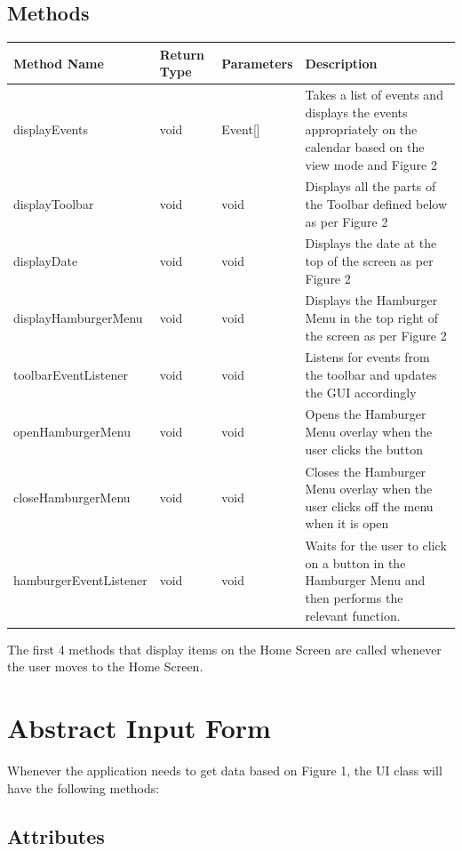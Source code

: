 \documentclass{scrreprt}
\begin{document}
\subsection{Methods}

\begin{center}
\begin{longtable}{ | p{5cm} | p{2cm} | p{3cm} | p{5cm} | }
\hline
\textbf{Method Name} & \textbf{Return Type} & \textbf{Parameters} & \textbf{Description} \\
\hline
displayEvents & void & Event[] & Takes a list of events and displays the events appropriately on the calendar based on the view mode and Figure 2 \\
\hline
displayToolbar & void & void & Displays all the parts of the Toolbar defined below as per Figure 2 \\
\hline
displayDate & void & void & Displays the date at the top of the screen as per Figure 2 \\
\hline
displayHamburgerMenu & void & void & Displays the Hamburger Menu in the top right of the screen as per Figure 2 \\
\hline
toolbarEventListener & void & void & Listens for events from the toolbar and updates the GUI accordingly \\
\hline
openHamburgerMenu & void & void & Opens the Hamburger Menu overlay when the user clicks the button \\
\hline
closeHamburgerMenu & void & void & Closes the Hamburger Menu overlay when the user clicks off the menu when it is open \\
\hline
hamburgerEventListener & void & void & Waits for the user to click on a button in the Hamburger Menu and then performs the relevant function. \\
\hline
\end{longtable}
\end{center}

The first 4 methods that display items on the Home Screen are called whenever the user moves to the Home Screen.

\section{Abstract Input Form}

Whenever the application needs to get data based on Figure 1, the UI class will have the following methods:

\subsection{Attributes}
\end{document}
